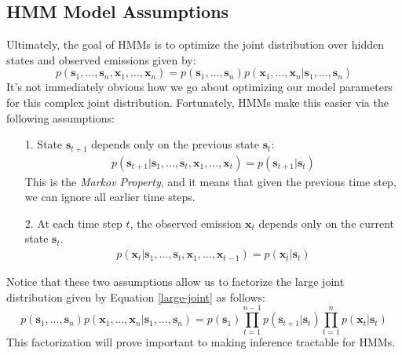 \subsection{HMM Model Assumptions}
Ultimately, the goal of HMMs is to optimize the joint distribution over hidden states and observed emissions given by:
\begin{equation} \label{large-joint}
	p(\textbf{s}_1, ..., \textbf{s}_n, \textbf{x}_1, ..., \textbf{x}_n) = p(\textbf{s}_1, ..., \textbf{s}_n) p(\textbf{x}_1, ..., \textbf{x}_n | \textbf{s}_1, ..., \textbf{s}_n)
\end{equation}
It's not immediately obvious how we go about optimizing our model parameters for this complex joint distribution. Fortunately, HMMs make this easier via the following assumptions:
\begin{itemize}
    \item[1.] State $\textbf{s}_{t+1}$ depends only on the previous state $\textbf{s}_t$:
	    \begin{align*}
	    	p(\textbf{s}_{t+1} | \textbf{s}_{1}, ..., \textbf{s}_{t}, \textbf{x}_{1}, ..., \textbf{x}_{t}) = p(\textbf{s}_{t+1} | \textbf{s}_{t}) 
	    \end{align*}
    	This is the \textit{Markov Property}, and it means that given the previous time step, we can ignore all earlier time steps.
    \item[2.] At each time step $t$, the observed emission $\textbf{x}_t$ depends only on the current state $\textbf{s}_t$.
    	\begin{align*}
	    	p(\textbf{x}_{t} | \textbf{s}_{1}, ..., \textbf{s}_{t}, \textbf{x}_{1}, ..., \textbf{x}_{t-1}) = p(\textbf{x}_{t} | \textbf{s}_{t}) 
	    \end{align*}
\end{itemize}
Notice that these two assumptions allow us to factorize the large joint distribution given by Equation \ref{large-joint} as follows:
\begin{equation} \label{factorized-joint}
	p(\textbf{s}_1, ..., \textbf{s}_n) p(\textbf{x}_1, ..., \textbf{x}_n | \textbf{s}_1, ..., \textbf{s}_n) = p(\textbf{s}_1) \prod_{t=1}^{n-1} p(\textbf{s}_{t+1} | \textbf{s}_t) \prod_{t=1}^{n} p(\textbf{x}_t | \textbf{s}_t)
\end{equation}
This factorization will prove important to making inference tractable for HMMs.

